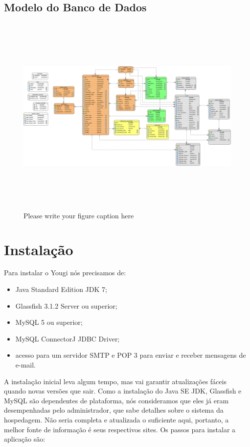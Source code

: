 \documentclass[envcountsame,envcountchap]{svmono}
\begin{document}
\section{Modelo do Banco de Dados}

\begin{figure}
\centering
\includegraphics[height=10cm, angle=90]{figures/relational-model}
\caption{Please write your figure caption here}
\label{fig:1}
\end{figure}

\chapter{Instalação}

Para instalar o Yougi nós precisamos de:

\begin{itemize}
\item Java Standard Edition JDK 7;
\item Glassfish 3.1.2 Server ou superior;
\item MySQL 5 ou superior;
\item MySQL ConnectorJ JDBC Driver;
\item acesso para um servidor SMTP e POP 3 para enviar e receber 			  mensagens de e-mail.
\end{itemize}

A instalação inicial leva algum tempo, mas vai garantir atualizações fáceis quando novas versões que sair. Como a instalação do Java SE JDK, Glassfish e MySQL são dependentes de plataforma, nós consideramos que eles já eram desempenhadas pelo administrador, que sabe detalhes sobre o sistema da hospedagem. Não seria completa e atualizada o suficiente aqui, portanto, a melhor fonte de informação é seus respectivos sites. Os passos para instalar a aplicação são:
\end{document}
